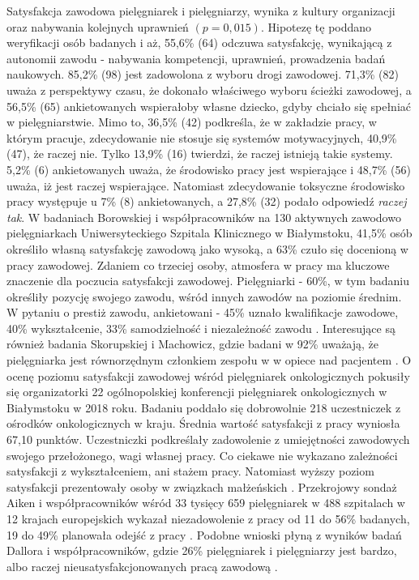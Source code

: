 \documentclass[a4paper,12pt,twoside,openright]{mwrep}
\begin{document}
Satysfakcja zawodowa pielęgniarek i pielęgniarzy, wynika z kultury organizacji oraz nabywania kolejnych uprawnień $(p = 0,015)$. Hipotezę tę poddano weryfikacji osób badanych i aż, 55,6\%  (64) odczuwa satysfakcję, wynikającą z autonomii zawodu - nabywania kompetencji, uprawnień, prowadzenia badań naukowych.   85,2\% (98) jest zadowolona z wyboru drogi zawodowej. 71,3\% (82) uważa z perspektywy czasu, że dokonało właściwego wyboru ścieżki zawodowej, a 56,5\% (65) ankietowanych wspierałoby własne dziecko, gdyby chciało się spełniać w pielęgniarstwie. Mimo to, 36,5\% (42) podkreśla, że w zakładzie pracy, w którym pracuje,   zdecydowanie nie stosuje się systemów motywacyjnych, 40,9\% (47), że raczej nie. Tylko 13,9\% (16) twierdzi, że raczej istnieją takie systemy. 5,2\% (6) ankietowanych uważa, że środowisko pracy jest wspierające i 48,7\%  (56)  uważa, iż jest raczej wspierające. Natomiast zdecydowanie toksyczne środowisko pracy występuje u 7\% (8) ankietowanych, a 27,8\%  (32) podało odpowiedź \textit{raczej tak}. W badaniach  Borowskiej i współpracowników na 130 aktywnych zawodowo pielęgniarkach Uniwersyteckiego Szpitala Klinicznego w Białymstoku, 41,5\% osób określiło własną satysfakcję zawodową jako wysoką, a 63\% czuło się docenioną w pracy zawodowej. Zdaniem co trzeciej osoby, atmosfera w pracy ma kluczowe znaczenie dla poczucia satysfakcji zawodowej. Pielęgniarki - 60\%, w tym badaniu określiły  pozycję swojego zawodu, wśród innych zawodów na poziomie średnim. W pytaniu o prestiż zawodu, ankietowani - 45\% uznało kwalifikacje zawodowe, 40\% wykształcenie, 33\% samodzielność i niezależność zawodu \cite{zbiorowa}. Interesujące są również badania Skorupskiej  i Machowicz, gdzie badani w 92\% uważają, że pielęgniarka jest równorzędnym członkiem zespołu w w opiece nad pacjentem \cite{skorupska}. O ocenę poziomu satysfakcji zawodowej wśród pielęgniarek onkologicznych pokusiły się organizatorki 22 ogólnopolskiej konferencji pielęgniarek onkologicznych w Białymstoku w 2018 roku. Badaniu poddało się dobrowolnie 218 uczestniczek z ośrodków onkologicznych w kraju. Średnia wartość satysfakcji z pracy wyniosła 67,10 punktów. Uczestniczki podkreślały zadowolenie z umiejętności zawodowych swojego przełożonego, wagi własnej pracy. Co ciekawe nie wykazano zależności satysfakcji z wykształceniem, ani stażem pracy. Natomiast wyższy poziom satysfakcji prezentowały osoby w związkach małżeńskich \cite{onkologiczne}. Przekrojowy sondaż Aiken i współpracowników wśród  33 tysięcy 659 pielęgniarek w 488 szpitalach w 12 krajach europejskich wykazał niezadowolenie z pracy  od 11 do 56\% badanych, 19 do 49\% planowała odejść z pracy \cite{termedia}. Podobne wnioski płyną z wyników badań Dallora  i współpracowników, gdzie 26\% pielęgniarek i pielęgniarzy jest bardzo, albo raczej nieusatysfakcjonowanych pracą zawodową \cite{dalora}.
\end{document}
